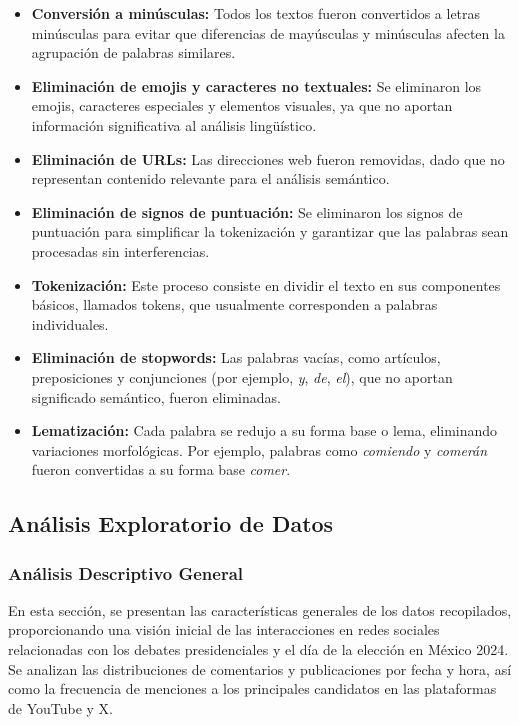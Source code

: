 \documentclass[10pt, a4paper]{article}
\begin{document}
	\begin{itemize}
		\item \textbf{Conversión a minúsculas:} Todos los textos fueron convertidos a letras minúsculas para evitar que diferencias de mayúsculas y minúsculas afecten la agrupación de palabras similares.
		
		\item \textbf{Eliminación de emojis y caracteres no textuales:} Se eliminaron los emojis, caracteres especiales y elementos visuales, ya que no aportan información significativa al análisis lingüístico.
		
		\item \textbf{Eliminación de URLs:} Las direcciones web fueron removidas, dado que no representan contenido relevante para el análisis semántico.
		
		\item \textbf{Eliminación de signos de puntuación:} Se eliminaron los signos de puntuación para simplificar la tokenización y garantizar que las palabras sean procesadas sin interferencias.
		
		\item \textbf{Tokenización:} Este proceso consiste en dividir el texto en sus componentes básicos, llamados tokens, que usualmente corresponden a palabras individuales.
		
		\item \textbf{Eliminación de stopwords:} Las palabras vacías, como artículos, preposiciones y conjunciones (por ejemplo, \textit{y}, \textit{de}, \textit{el}), que no aportan significado semántico, fueron eliminadas.
		
		\item \textbf{Lematización:} Cada palabra se redujo a su forma base o lema, eliminando variaciones morfológicas. Por ejemplo, palabras como \textit{comiendo} y \textit{comerán} fueron convertidas a su forma base \textit{comer}.
	\end{itemize}
	
	\subsection{Análisis Exploratorio de Datos}
	
	\subsubsection{Análisis Descriptivo General}
	En esta sección, se presentan las características generales de los datos recopilados, proporcionando una visión inicial de las interacciones en redes sociales relacionadas con los debates presidenciales y el día de la elección en México 2024. Se analizan las distribuciones de comentarios y publicaciones por fecha y hora, así como la frecuencia de menciones a los principales candidatos en las plataformas de YouTube y X.
	
\end{document}
